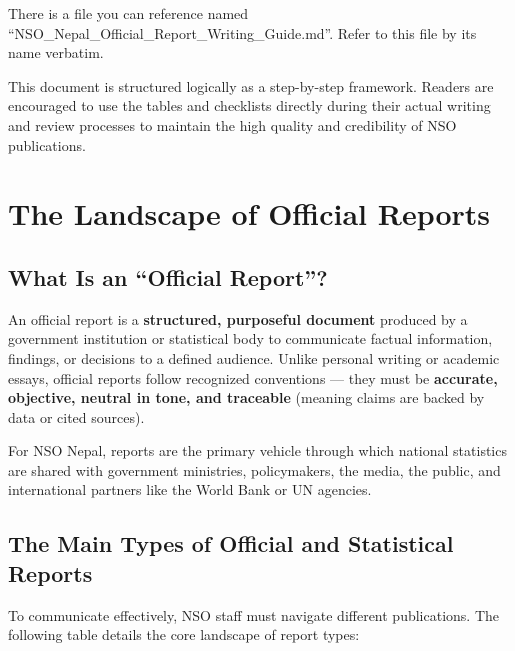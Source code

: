 \documentclass[11pt,a4paper,oneside]{book}
\begin{document}
There is a file you can reference named ``NSO\_Nepal\_Official\_Report\_Writing\_Guide.md''. Refer to this file by its name verbatim.

\vspace{1.5cm}
\begin{tcolorbox}[nsoshadedbox, title=\textbf{How to Use This Handbook}]
    This document is structured logically as a step-by-step framework. Readers are encouraged to use the tables and checklists directly during their actual writing and review processes to maintain the high quality and credibility of NSO publications.
\end{tcolorbox}

\clearpage
\tableofcontents
\clearpage

\mainmatter

\chapter{The Landscape of Official Reports}

\section{What Is an ``Official Report''?}

An official report is a \textbf{structured, purposeful document} produced by a government institution or statistical body to communicate factual information, findings, or decisions to a defined audience. Unlike personal writing or academic essays, official reports follow recognized conventions --- they must be \textbf{accurate, objective, neutral in tone, and traceable} (meaning claims are backed by data or cited sources).

For NSO Nepal, reports are the primary vehicle through which national statistics are shared with government ministries, policymakers, the media, the public, and international partners like the World Bank or UN agencies.

\section{The Main Types of Official and Statistical Reports}

To communicate effectively, NSO staff must navigate different publications. The following table details the core landscape of report types:
\end{document}
